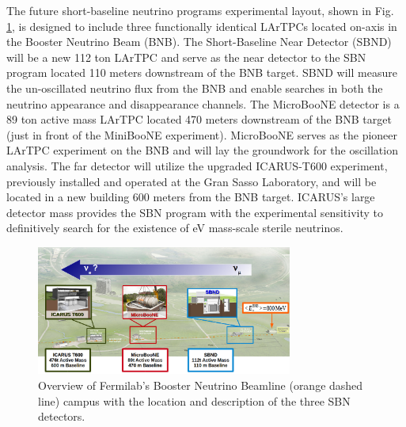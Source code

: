 The future short-baseline neutrino programs experimental layout, shown in Fig. \ref{fig:SBNMap}, is designed to include three functionally identical LArTPCs located on-axis in the Booster Neutrino Beam (BNB).  The Short-Baseline Near Detector (SBND) will be a new 112 ton LArTPC and serve as the near detector to the SBN program located 110 meters downstream of the BNB target. SBND will measure the un-oscillated neutrino flux from the BNB and enable searches in both the neutrino appearance and disappearance channels. The MicroBooNE detector is a 89 ton active mass LArTPC located 470 meters downstream of the BNB target (just in front of the MiniBooNE experiment). MicroBooNE serves as the pioneer LArTPC experiment on the BNB and will lay the groundwork for the oscillation analysis. The far detector will utilize the upgraded ICARUS-T600 experiment, previously installed and operated at the Gran Sasso Laboratory, and will be located in a new building 600 meters from the BNB target. ICARUS's large detector mass provides the SBN program with the experimental sensitivity to definitively search for the existence of eV mass-scale sterile neutrinos.

\begin{figure}[htb]
\centering
\includegraphics[width=0.75\textwidth]{images/SBNLayout2.png}
\caption[]{Overview of Fermilab's Booster Neutrino Beamline (orange dashed line) campus with the location and description of the three SBN detectors.}
\label{fig:SBNMap}
\end{figure}
